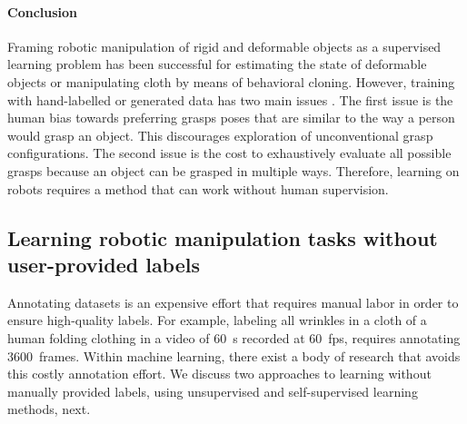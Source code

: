 \documentclass[\home/main.tex]{subfiles}
\begin{document}
\paragraph{Conclusion}
Framing robotic manipulation of rigid and deformable objects as a supervised learning problem has been successful for estimating the state of deformable objects or manipulating cloth by means of behavioral cloning. However, training with hand-labelled or generated data has two main issues \autocite{pinto2016supersizing}. The first issue is the human bias towards preferring grasps poses that are similar to the way a person would grasp an object. This discourages exploration of unconventional grasp configurations. The second issue is the cost to exhaustively evaluate all possible grasps because an object can be grasped in multiple ways. Therefore, learning on robots requires a method that can work without human supervision.

\subsection{Learning robotic manipulation tasks without user-provided labels}
Annotating datasets is an expensive effort that requires manual labor in order to ensure high-quality labels. For example, labeling all wrinkles in a cloth of a human folding clothing in a video of \qty[mode=text]{60}{\second} recorded at \qty{60}{\unit{fps}}, requires annotating \qty{3600}{frames}. Within machine learning, there exist a body of research that avoids this costly annotation effort. We discuss two approaches to learning without manually provided labels, using unsupervised and self-supervised learning methods, next. 
\end{document}
